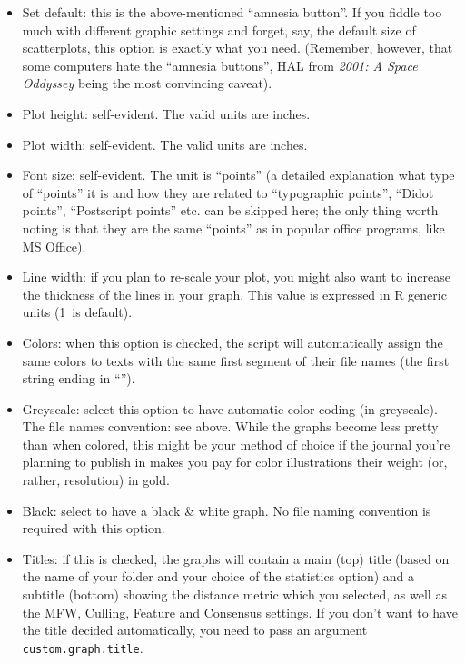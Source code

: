 \documentclass[11pt,a4paper]{article}
\def\underscore{\raisebox{-.8ex}{-}}
\def\margin#1{\marginpar{\textcolor{blue}{\footnotesize\tt #1}}}
\def\code#1{{\tt #1}}
\begin{document}
\begin{itemize}
\item Set default: this is the above-mentioned ``amnesia button''.\margin{plot.options.reset=}\margin{TRUE|FALSE}
If you fiddle too much with different graphic settings and forget,
say, the default size of scatterplots, this option is exactly what
you need. (Remember, however, that some computers hate the ``amnesia
buttons'', HAL from \emph{2001: A Space Oddyssey} being the most convincing
caveat). 

\item Plot height: self-evident. The valid units are inches.\margin{plot.custom.height=} 

\item Plot width: self-evident. The valid units are inches.\margin{plot.custom.width=} 

\item Font size: self-evident.\margin{plot.font.size=}\margin{<integer>}
The unit is ``points'' (a detailed explanation what type of ``points''
it is and how they are related to ``typographic points'', ``Didot points'',
``Postscript points'' etc. can be skipped here; the only thing worth
noting is that they are the same ``points'' as in popular office programs,
like MS Office). 

\item Line width:\margin{plot.line.thickness=}\margin{<integer>} if
you plan to re-scale your plot, you might also want to increase the
thickness of the lines in your graph. This value is expressed in R
generic units (1~is default). 

\item Colors:\margin{colors.on.graphs=}\margin{"colors"}
when this option is checked, the script will automatically assign
the same colors to texts with the same first segment of their file
names (the first string ending in ``{}\code{\underscore}''). 

\item Greyscale:\margin{"greyscale"} select
this option to have automatic color coding (in greyscale). The file
names convention: see above. While the graphs become less pretty than
when colored, this might be your method of choice if the journal you're
planning to publish in makes you pay for color illustrations their
weight (or, rather, resolution) in gold.

\item Black:\margin{"black"} select to have
a black \& white graph. No file naming convention is required with this option. 

\item Titles:\margin{titles.on.graphs=}\margin{TRUE|FALSE} if this
is checked, the graphs will contain a main (top) title (based on the
name of your folder and your choice of the statistics option) and
a subtitle (bottom) showing the distance metric which you selected,
as well as the MFW, Culling, Feature and Consensus settings.%
\margin{custom.graph.title=}\margin{"Any text"}
If you don't want to have the title decided automatically, you need to 
pass an argument \code{custom.graph.title}.
\end{itemize}
\end{document}
